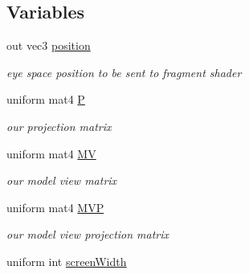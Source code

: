 \subsection*{Variables}
\begin{DoxyCompactItemize}
\item 
\hypertarget{thickness_vert_8glsl_af78042b263da1185c97c3202ced45aab}{out vec3 \hyperlink{thickness_vert_8glsl_af78042b263da1185c97c3202ced45aab}{position}}\label{thickness_vert_8glsl_af78042b263da1185c97c3202ced45aab}

\begin{DoxyCompactList}\small\item\em eye space position to be sent to fragment shader \end{DoxyCompactList}\item 
\hypertarget{thickness_vert_8glsl_a06f273d5c491bfbe3897fc9c73dcf0d5}{uniform mat4 \hyperlink{thickness_vert_8glsl_a06f273d5c491bfbe3897fc9c73dcf0d5}{P}}\label{thickness_vert_8glsl_a06f273d5c491bfbe3897fc9c73dcf0d5}

\begin{DoxyCompactList}\small\item\em our projection matrix \end{DoxyCompactList}\item 
\hypertarget{thickness_vert_8glsl_aea165d91373502f69ddf839215635405}{uniform mat4 \hyperlink{thickness_vert_8glsl_aea165d91373502f69ddf839215635405}{M\-V}}\label{thickness_vert_8glsl_aea165d91373502f69ddf839215635405}

\begin{DoxyCompactList}\small\item\em our model view matrix \end{DoxyCompactList}\item 
\hypertarget{thickness_vert_8glsl_ae56d8b04842b99426c8844c0785d3090}{uniform mat4 \hyperlink{thickness_vert_8glsl_ae56d8b04842b99426c8844c0785d3090}{M\-V\-P}}\label{thickness_vert_8glsl_ae56d8b04842b99426c8844c0785d3090}

\begin{DoxyCompactList}\small\item\em our model view projection matrix \end{DoxyCompactList}\item 
\hypertarget{thickness_vert_8glsl_a62a808a061d03e4a62f2d46d3e6efb38}{uniform int \hyperlink{thickness_vert_8glsl_a62a808a061d03e4a62f2d46d3e6efb38}{screen\-Width}}\label{thickness_vert_8glsl_a62a808a061d03e4a62f2d46d3e6efb38}


\end{DoxyCompactItemize}
